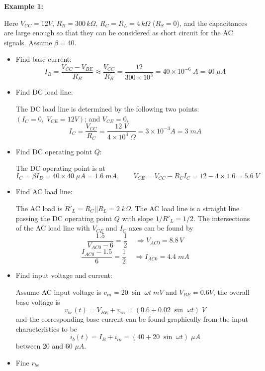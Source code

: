 {\bf Example 1:} 


Here $V_{CC}=12V$, $R_B=300\,k\Omega$, $R_C=R_L=4\,k\Omega$ ($R_S=0$), and the 
capacitances are large enough so that they can be considered as short circuit
for the AC signals. Assume $\beta=40$.


\begin{itemize}
\item Find base current:
  \[
  I_B=\frac{V_{CC}-V_{BE}}{R_B} \approx \frac{V_{CC}}{R_B}=\frac{12}{300\times 10^3}
  =40\times 10^{-6}\; A=40\;\mu A	
  \]

\item Find DC load line:

  The DC load line is determined by the following two points:
  $(I_C=0,\;V_{CE}=12V)$; and $V_{CE}=0$,
  \[
  I_C=\frac{V_{CC}}{R_C}=\frac{12\;V}{4\times 10^3\;\Omega}=3\times 10^{-3}A=3 \;mA	
  \]

\item Find DC operating point $Q$: 

  The DC operating point is at 
  \[
  I_C=\beta I_B=40\times 40\;\mu A=1.6\;mA,\;\;\;\;\;\;\;
  V_{CE}=V_{CC}-R_CI_C=12-4\times 1.6=5.6\;V
  \]

\item Find AC load line: 

  The AC load is $R'_L=R_C||R_L=2\;k\Omega$. The AC load line is a 
  straight line passing the DC operating point $Q$ with slope 
  $1/R'_L=1/2$. The intersections of the AC load line with $V_{CE}$
  and $I_C$ axes can be found by
  \[
  \frac{1.5}{V_{AC0}-6}=\frac{1}{2}\;\;\;\;\Longrightarrow V_{AC0}=8.8\,V
  \]
  \[
  \frac{I_{AC0}-1.5}{6}=\frac{1}{2}\;\;\;\;\Longrightarrow I_{AC0}=4.4\;mA 
  \]
\item Find input voltage and current:
  
  Assume AC input voltage is $v_{in}=20\;\sin\;\omega t\;mV$ and 
  $V_{BE}=0.6V$, the overall base voltage is
  \[
  v_{be}(t)=V_{BE}+v_{in}=(0.6+0.02\;\sin\;\omega t)\;V
  \]
  and the corresponding base current can be found graphically from the 
  input characteristics to be 
  \[
  i_b(t)=I_B+i_{in}=(40+20\;\sin\;\omega t)\;\mu A
  \] 
  between 20 and 60 $\mu A$. 
\item Fine $r_{be}$
  

\end{itemize}
